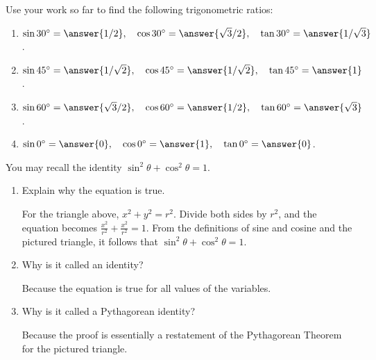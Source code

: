 \documentclass[nooutcomes]{ximera}
\begin{document}
\begin{problem}
Use your work so far to find the following trigonometric ratios:
\begin{enumerate}
\item $\sin 30^\circ = \answer{1/2}, \quad \cos30^\circ = \answer{\sqrt{3}/2}, \quad \tan30^\circ = \answer{1/\sqrt{3}}$.
\item $\sin 45^\circ = \answer{1/\sqrt{2}}, \quad \cos45^\circ = \answer{1/\sqrt{2}}, \quad \tan45^\circ = \answer{1}$.
\item $\sin 60^\circ = \answer{\sqrt{3}/2}, \quad \cos60^\circ = \answer{1/2}, \quad \tan60^\circ = \answer{\sqrt{3}}$.
\item $\sin 0^\circ = \answer{0}, \quad \cos0^\circ = \answer{1}, \quad \tan0^\circ = \answer{0}$.
\end{enumerate}
\end{problem}


\begin{problem}
You may recall the identity $\sin^2\theta+\cos^2\theta=1$.  
\begin{enumerate}
\item Explain why the equation is true.  \begin{hint}For the triangle above, $x^2 + y^2 = r^2$.  Divide both sides by $r^2$, and the equation becomes $\frac{x^2}{r^2} + \frac{x^2}{r^2} = 1$.  From the definitions of sine and cosine and the pictured triangle, it follows that $\sin^2\theta+\cos^2\theta=1$.\end{hint}
\item Why is it called an identity?  \begin{hint}Because the equation is true for all values of the variables.\end{hint}
\item Why is it called a Pythagorean identity?  \begin{hint}Because the proof is essentially a restatement of the Pythagorean Theorem for the pictured triangle.\end{hint}
\end{enumerate}
\begin{freeResponse}
\end{freeResponse}
\end{problem}
\end{document}

